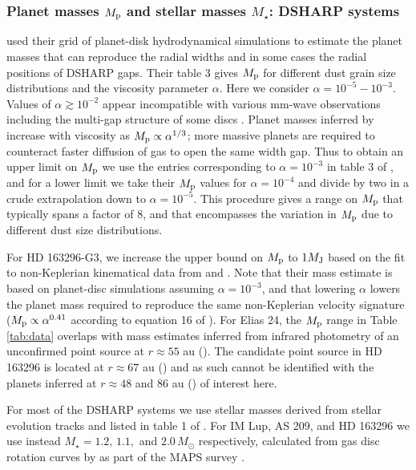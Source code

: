 \documentclass[fleqn,usenatbib]{mnras}
\newcommand{\Msun}{M_{\odot}}
\begin{document}
\subsubsection{Planet masses $M_{\rm p}$ and stellar masses $M_{\star}$: DSHARP systems}
\label{subsubsec:masses_dsharp}
\cite{zhang_etal_2018} used their grid of planet-disk hydrodynamical simulations to
estimate the planet masses 
that can reproduce the 
radial widths and in some cases the
radial positions of 
DSHARP gaps. Their table 3 gives $M_{\rm p}$ for different 
dust grain size distributions and the \cite{shakura_sunyaev_1973} viscosity parameter $\alpha$. Here we consider $\alpha = 10^{-5}-10^{-3}$. 
Values of $\alpha \gtrsim 10^{-2}$ appear incompatible with various mm-wave observations \citep{pinte_etal_2016, teague_etal_2016, flaherty_etal_2017} including the multi-gap structure of some discs \citep{dong_etal_2017, zhang_etal_2018}. Planet masses inferred by \citet{zhang_etal_2018} increase with viscosity as $M_{\rm p} \propto \alpha^{1/3}$; more massive planets are required to counteract faster diffusion of gas to open the same width gap. 
Thus to obtain an upper limit on $M_{\rm p}$ we use the entries corresponding to $\alpha = 10^{-3}$ in table 3 of \cite{zhang_etal_2018}, and for a lower limit we take their $M_{\rm p}$ values for $\alpha = 10^{-4}$ and divide by two in a crude extrapolation down to $\alpha = 10^{-5}$. This procedure gives a range on $M_{\rm p}$ that typically spans a factor of 8, and that encompasses the variation in $M_{\rm p}$ due to different dust size distributions.

For HD 163296-G3, we increase the upper bound on $M_{\rm p}$ to $1 M_{\rm J}$ based on the fit to non-Keplerian kinematical data from \cite{teague_etal_2018} and \cite{teague_etal_2021}. Note that their mass estimate is based on planet-disc simulations assuming $\alpha = 10^{-3}$, and that lowering $\alpha$ lowers the planet mass required to reproduce the same non-Keplerian velocity signature ($M_{\rm p} \propto \alpha^{0.41}$ according to equation 16 of \citealt{zhang_etal_2018}).
For Elias 24, the $M_{\rm p}$ range in Table \ref{tab:data} overlaps with mass estimates inferred from infrared photometry of an unconfirmed point source at $r \approx 55$ au (\citealt{jorquera_etal_2021}). The candidate point source in HD 163296 is located at $r \approx 67$ au (\citealt{guidi_etal_2018})
and as such cannot be identified with the planets inferred at $r \approx 48$ and 86 au (\citealt{zhang_etal_2018}) of interest here.

For most of the DSHARP systems we use stellar masses derived from  stellar evolution tracks and listed in table 1 of \cite{andrews_etal_2018}. For IM Lup, AS 209, and HD 163296 we use instead $M_{\star} = 1.2,\,1.1,$ and $2.0\,\Msun$ respectively, calculated from gas disc rotation curves by \cite{teague_etal_2021} 
as part of the MAPS survey \citep{oberg_etal_2021}.
\end{document}
